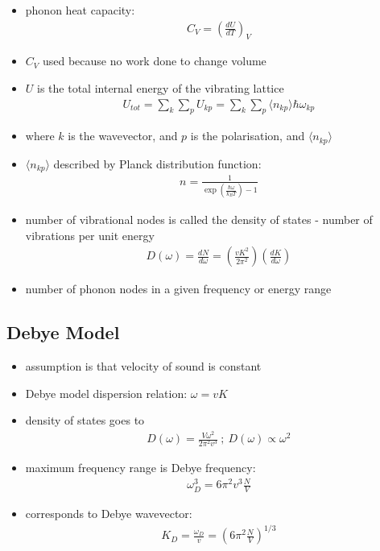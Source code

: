 \documentclass[a4paper,11pt,normalem]{article}
\begin{document}
\begin{itemize}
    \item phonon heat capacity:
        \begin{align*}
            C_V = \left(\frac{dU}{dT}\right)_V
        \end{align*}
    \item \(C_V\) used because no work done to change volume
    \item \(U\) is the total internal energy of the vibrating lattice
        \begin{align*}
            U_{tot} = \sum_k \sum_p U_{kp} = \sum_k\sum_p \langle n_{kp} \rangle \hbar \omega_{kp}
        \end{align*}
    \item where \(k\) is the wavevector, and \(p\) is the polarisation, and \(\langle n_{kp} \rangle\)
    \item \(\langle n_{kp} \rangle\) described by Planck distribution function:
        \begin{align*}
            n = \frac{1}{\exp\left(\frac{\hbar\omega}{k_BT}\right) - 1}
        \end{align*}
    \item number of vibrational nodes is called the density of states - number of vibrations per unit energy
        \begin{align*}
            D(\omega) = \frac{dN}{d\omega} = \left(\frac{vK^2}{2\pi^2}\right)\left(\frac{dK}{d\omega}\right)
        \end{align*}
    \item number of phonon nodes in a given frequency or energy range
\end{itemize}

\subsection{Debye Model}

\begin{itemize}
    \item assumption is that velocity of sound is constant
    \item Debye model dispersion relation: \(\omega = vK\)
    \item density of states goes to
        \begin{align*}
            D(\omega) = \frac{V\omega^2}{2\pi^2v^3} ~;~ D(\omega) \propto \omega^2
        \end{align*}
    \item maximum frequency range is Debye frequency:
        \begin{align*}
            \omega_D^3 = 6\pi^2v^3 \frac{N}{V}
        \end{align*}
    \item corresponds to Debye wavevector:
        \begin{align*}
            K_D = \frac{\omega_D}{v} = \left(6\pi^2\frac{N}{V}\right)^{1/3}
        \end{align*}
\end{itemize}
\end{document}
